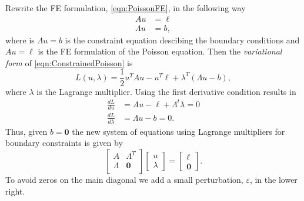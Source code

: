 Rewrite the FE formulation, \eqref{eqn:PoissonFE}, in the following way
\begin{equation}
  \begin{split}
    A u &= \ell \\
    \Lambda u &= b,
  \end{split}
  \label{eqn:ConstrainedPoisson}
\end{equation}
where is $\Lambda u = b$ is the constraint equation descibing the boundary
conditions and $A u = \ell$ is the FE formulation of the Poisson equation.
Then the \emph{variational form} of \eqref{eqn:ConstrainedPoisson} is
\begin{equation}
  L(u,\lambda) = \frac{1}{2}u^T A u - u^T \ell + \lambda^T (\Lambda u - b),
  \label{eqn:Variational}
\end{equation}
where $\lambda$ is the Lagrange multiplier. Using the first derivative condition
results in
\begin{equation}
  \begin{split}
    \frac{d L}{du} &= Au - \ell + \Lambda^t \lambda = 0 \\
    \frac{d L}{d\lambda} &= \Lambda u - b = 0.
  \end{split}
  \label{eqn:Condition}
\end{equation}
Thus, given $b = \mathbf{0}$ the new system of equations using Lagrange
multipliers for boundary constraints is given by
\begin{equation}
  \begin{bmatrix}
    A & \Lambda^T \\
    \Lambda &  \mathbf{0} \\
  \end{bmatrix} \begin{bmatrix}
    u \\ \lambda
  \end{bmatrix} = \begin{bmatrix}
    \ell \\ \mathbf{0}
  \end{bmatrix}.
  \label{eqn:Lagrange}
\end{equation}
To avoid zeros on the main diagonal we add a small perturbation, $\varepsilon$,
in the lower right.
